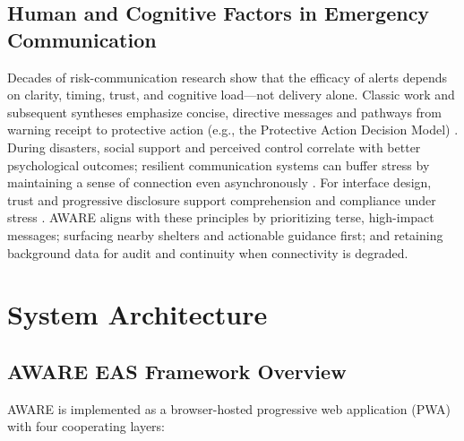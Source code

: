 \documentclass[11pt,twocolumn]{article}
\begin{document}
\subsection{Human and Cognitive Factors in Emergency Communication}
Decades of risk-communication research show that the efficacy of alerts depends on clarity, timing, trust, and cognitive load—not delivery alone. Classic work and subsequent syntheses emphasize concise, directive messages and pathways from warning receipt to protective action (e.g., the Protective Action Decision Model) \cite{mileti-1990-ornl6609,lindell-2012-padm,nasem-2018-alerts,cdc-cerc-2014}. During disasters, social support and perceived control correlate with better psychological outcomes; resilient communication systems can buffer stress by maintaining a sense of connection even asynchronously \cite{cohen-1985-socialsupport,norris-2008-resilience}. For interface design, trust and progressive disclosure support comprehension and compliance under stress \cite{paton-2008-warningresponse}. AWARE aligns with these principles by prioritizing terse, high-impact messages; surfacing nearby shelters and actionable guidance first; and retaining background data for audit and continuity when connectivity is degraded.

\section{System Architecture}

\subsection{AWARE EAS Framework Overview}
AWARE is implemented as a browser-hosted progressive web application (PWA) with four cooperating layers:
\end{document}

